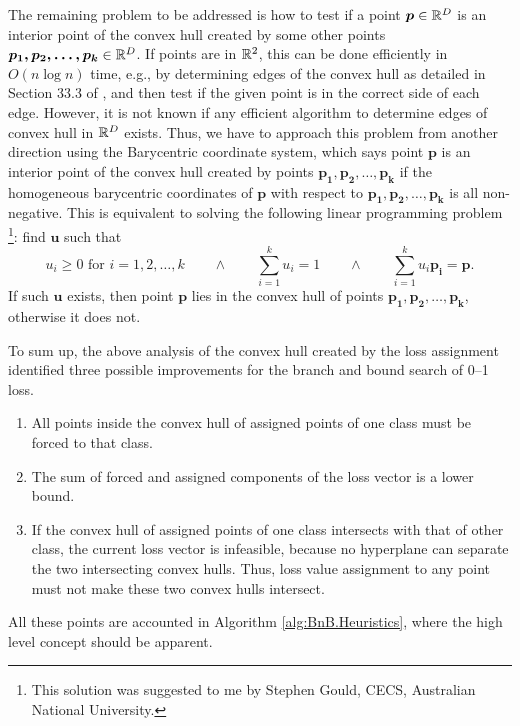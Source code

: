 The remaining problem to be addressed is how to test if a point
$\boldsymbol{p} \in \mathbb{R}^D$ is an interior point of the convex hull
created by some other points $\boldsymbol{p_1, p_2, \dots, p_k} \in
\mathbb{R}^D$. If points are in $\mathbb{R}^2$, this can be done efficiently in $O(n
\log n)$ time, e.g., by determining edges of the convex hull as
detailed in Section 33.3 of \cite{cormen}, and then test if the given
point is in the correct side of each edge. However, it is not known if
any efficient algorithm to determine edges of convex hull in $\mathbb{R}^D$
exists. Thus, we have to approach this problem from another direction
using the Barycentric coordinate system, which says point
$\boldsymbol{p}$ is an interior point of the convex hull created by
points $\boldsymbol{p_1, p_2, \dots, p_k}$ if the homogeneous
barycentric coordinates of $\boldsymbol{p}$ with respect to
$\boldsymbol{p_1, p_2, \dots, p_k}$ is all non-negative. This is
equivalent to solving the following linear programming
problem \footnote{This solution was suggested to me by Stephen Gould,
  CECS, Australian National University.}: find $\boldsymbol{u}$ such
that
$$
u_i \geq 0 \text{ for } i = 1,2, \dots, k \quad \quad \land \quad \quad
\sum_{i=1}^k u_i = 1 \quad \quad \land \quad \quad
\sum_{i=1}^k u_i \boldsymbol{p_i} = \boldsymbol{p}. 
$$ If such $\boldsymbol{u}$ exists, then point $\boldsymbol{p}$ lies
in the convex hull of points $\boldsymbol{p_1, p_2, \dots, p_k}$,
otherwise it does not.

To sum up, the above analysis of the convex hull created by the loss
assignment identified three possible improvements for the branch and
bound search of 0--1 loss.
\begin{enumerate}
\setlength{\itemsep}{0pt}
\setlength{\parskip}{0pt}
\item All points inside the convex hull of assigned points of one
  class must be forced to that class.
\item The sum of forced and assigned components of the loss vector is
  a lower bound.
\item If the convex hull of assigned points of one class intersects
  with that of other class, the current loss vector is infeasible,
  because no hyperplane can separate the two intersecting convex
  hulls. Thus, loss value assignment to any point must not make these
  two convex hulls intersect.
\end{enumerate}
All these points are accounted in Algorithm \ref{alg:BnB.Heuristics},
where the high level concept should be apparent.


